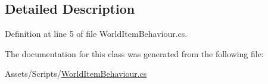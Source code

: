 \subsection{Detailed Description}


Definition at line 5 of file World\+Item\+Behaviour.\+cs.



The documentation for this class was generated from the following file\+:\begin{DoxyCompactItemize}
\item 
Assets/\+Scripts/\mbox{\hyperlink{_world_item_behaviour_8cs}{World\+Item\+Behaviour.\+cs}}\end{DoxyCompactItemize}
